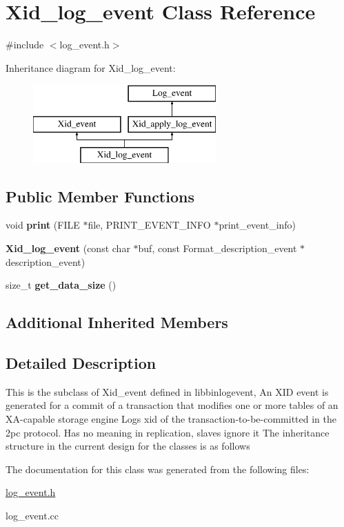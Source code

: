 \hypertarget{classXid__log__event}{}\section{Xid\+\_\+log\+\_\+event Class Reference}
\label{classXid__log__event}


{\ttfamily \#include $<$log\+\_\+event.\+h$>$}

Inheritance diagram for Xid\+\_\+log\+\_\+event\+:\begin{figure}[H]
\begin{center}
\leavevmode
\includegraphics[height=3.000000cm]{classXid__log__event}
\end{center}
\end{figure}
\subsection*{Public Member Functions}
\begin{DoxyCompactItemize}
\item 
\mbox{\label{classXid__log__event_ac1e94112541aeafb9849ba13d9a26a02}} 
void {\bfseries print} (F\+I\+LE $\ast$file, P\+R\+I\+N\+T\+\_\+\+E\+V\+E\+N\+T\+\_\+\+I\+N\+FO $\ast$print\+\_\+event\+\_\+info)
\item 
\mbox{\label{classXid__log__event_a1200b4d1daaadb6ae4c86e75e9c85680}} 
{\bfseries Xid\+\_\+log\+\_\+event} (const char $\ast$buf, const Format\+\_\+description\+\_\+event $\ast$description\+\_\+event)
\item 
\mbox{\label{classXid__log__event_a2d1e919bb12c7197b48cee327c37fe08}} 
size\+\_\+t {\bfseries get\+\_\+data\+\_\+size} ()
\end{DoxyCompactItemize}
\subsection*{Additional Inherited Members}


\subsection{Detailed Description}
This is the subclass of Xid\+\_\+event defined in libbinlogevent, An X\+ID event is generated for a commit of a transaction that modifies one or more tables of an XA-\/capable storage engine Logs xid of the transaction-\/to-\/be-\/committed in the 2pc protocol. Has no meaning in replication, slaves ignore it The inheritance structure in the current design for the classes is as follows 

The documentation for this class was generated from the following files\+:\begin{DoxyCompactItemize}
\item 
\mbox{\hyperlink{log__event_8h}{log\+\_\+event.\+h}}\item 
log\+\_\+event.\+cc\end{DoxyCompactItemize}
